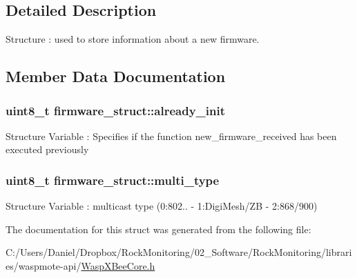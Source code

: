 \subsection{Detailed Description}
Structure \+: used to store information about a new firmware. 

\subsection{Member Data Documentation}
\subsubsection[{\texorpdfstring{already\+\_\+init}{already_init}}]{\setlength{\rightskip}{0pt plus 5cm}uint8\+\_\+t firmware\+\_\+struct\+::already\+\_\+init}\hypertarget{structfirmware__struct_aef6c8d3ca515b79cc90cd19771728cdc}{}\label{structfirmware__struct_aef6c8d3ca515b79cc90cd19771728cdc}
Structure Variable \+: Specifies if the function new\+\_\+firmware\+\_\+received has been executed previously 
\subsubsection[{\texorpdfstring{multi\+\_\+type}{multi_type}}]{\setlength{\rightskip}{0pt plus 5cm}uint8\+\_\+t firmware\+\_\+struct\+::multi\+\_\+type}\hypertarget{structfirmware__struct_aa6c65e36d85aad5b0b8bb459b7924005}{}\label{structfirmware__struct_aa6c65e36d85aad5b0b8bb459b7924005}
Structure Variable \+: multicast type (0\+:802.. -\/ 1\+:Digi\+Mesh/\+ZB -\/ 2\+:868/900) 

The documentation for this struct was generated from the following file\+:\begin{DoxyCompactItemize}
\item 
C\+:/\+Users/\+Daniel/\+Dropbox/\+Rock\+Monitoring/02\+\_\+\+Software/\+Rock\+Monitoring/libraries/waspmote-\/api/\hyperlink{_wasp_x_bee_core_8h}{Wasp\+X\+Bee\+Core.\+h}\end{DoxyCompactItemize}

